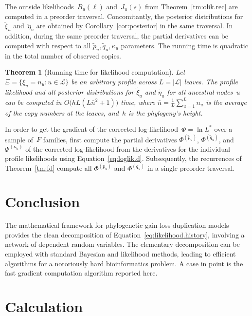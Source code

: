 \documentclass{elsarticle}
\newtheorem{theorem}{Theorem}
\newcommand{\nolik}{B}
\newcommand{\solik}{J}
\newcommand{\nx}{u}
\newcommand{\fdf}{\Phi}
\begin{document}
The outside likelihoods~$\nolik_{\nx}(\ell)$ and~$\solik_{\nx}(s)$ 
from Theorem~\ref{tm:olik.rec} are computed in a preorder traversal. 
Concomitantly, the posterior 
distributions for~$\tilde{\xi}_{\nx}$ and~$\tilde{\eta}_{\nx}$ 
are obtained by Corollary~\ref{cor:posterior} in the same traversal. 
In addition, during the same preorder traversal, the partial derivatives can be computed 
with respect to all 
$\tilde{p}_{\nx},\tilde{q}_{\nx},\kappa_{\nx}$ 
parameters. 
The running time is quadratic in the total number of observed copies. 
\begin{theorem}[Running time for likelihood computation]\label{tm:time}
Let $\Xi=\{\xi_{\nx}=n_{\nx}\colon \nx\in \mathcal{L}\}$ 
be an arbitrary profile across 
$L=|\mathcal{L}|$ leaves.
The profile likelihood
and all posterior distributions for $\tilde{\xi}_{\nx}$ and $\tilde{\eta}_{\nx}$ 
for all ancestral nodes~$\nx$
can be computed in $O\bigl(hL(L\bar{n}^2+1)\bigr)$ time, where  
$\bar{n}= \frac1L \sum_{\nx=1}^{L} n_{\nx}$
is the average of the copy numbers at the leaves, 
and~$h$ is the phylogeny's height. 
\end{theorem}

In order to get the gradient of the corrected log-likelihood~$\fdf=\ln L^*$
over a sample of~$F$ families, 
first compute 
the partial derivatives 
$\fdf^{(\tilde{p}_{\nx})}$,
$\fdf^{(\tilde{q}_{\nx})}$,
and 
$\fdf^{(\kappa_{\nx})}$
of the corrected log-likelihood 
from the derivatives for the individual profile likelihoods 
using Equation~\eqref{eq:loglik.d}. 
Subsequently, 
the recurrences of Theorem~\ref{tm:fd} compute 
all $\fdf^{(p_{\nx})}$ and 
$\fdf^{(q_{\nx})}$ in a single preorder traversal.  



\section{Conclusion}
The mathematical framework 
for phylogenetic gain-loss-duplication models 
provides the clean decomposition of Equation~\eqref{eq:likelihood.history}, 
involving a network of dependent random variables. 
The elementary decomposition 
can be employed with standard Bayesian and likelihood methods,
leading to efficient algorithms 
for a notoriously hard bioinformatics problem. 
A case in point is the fast gradient computation algorithm
reported here.  


\section{Calculation}
\end{document}
